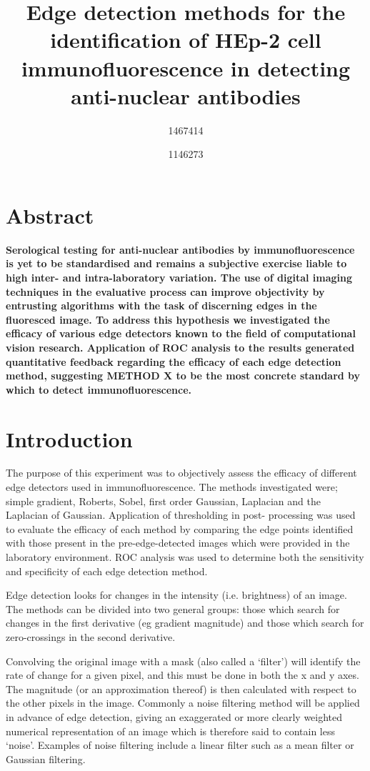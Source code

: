 \documentclass[a4paper]{article}
\title {\vspace{-3ex}Edge detection methods for the identification of HEp-2 cell immunofluorescence in detecting anti-nuclear antibodies}
\author {1467414 \and 1146273}
\begin{document}
\maketitle
\begin{multicols*}{2}


\section*{Abstract}
\textbf{Serological testing for anti-nuclear antibodies by immunofluorescence is yet to be standardised and remains a subjective exercise liable to high inter- and intra-laboratory variation. The use of digital imaging techniques in the evaluative process can improve objectivity by entrusting algorithms with the task of discerning edges in the fluoresced image. To address this hypothesis we investigated the efficacy of various edge detectors known to the field of computational vision research. Application of ROC analysis to the results generated quantitative feedback regarding the efficacy of each edge detection method, suggesting METHOD X to be the most concrete standard by which to detect immunofluorescence.}

\section*{Introduction}

The purpose of this experiment was to objectively assess the efficacy of different edge detectors used in immunofluorescence. The methods investigated were; simple gradient, Roberts, Sobel, first order Gaussian, Laplacian and the Laplacian of Gaussian. Application of thresholding in post- processing was used to evaluate the efficacy of each method by comparing the edge points identified with those present in the pre-edge-detected images which were provided in the laboratory environment. ROC analysis was used to determine both the sensitivity and specificity of each edge detection method. 

Edge detection looks for changes in the intensity (i.e. brightness) of an image. The methods can be divided into two general groups: those which search for changes in the first derivative (eg gradient magnitude) and those which search for zero-crossings in the second derivative. 

Convolving the original image with a mask (also called a ‘filter’) will identify the rate of change for a given pixel, and this must be done in both the x and y axes. The magnitude (or an approximation thereof) is then calculated with respect to the other pixels in the image. Commonly a noise filtering method will be applied in advance of edge detection, giving an exaggerated or more clearly weighted numerical representation of an image which is therefore said to contain less ‘noise’. Examples of noise filtering include a linear filter such as a mean filter or Gaussian filtering.


\end{multicols*}
\end{document}
